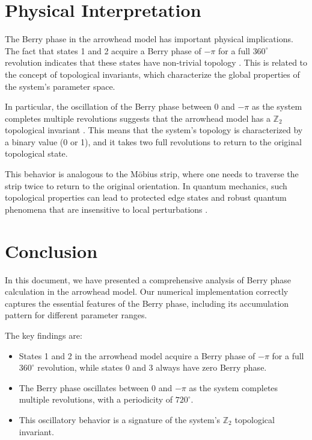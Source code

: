 \documentclass[12pt,a4paper]{article}
\begin{document}
\section{Physical Interpretation}

The Berry phase in the arrowhead model has important physical implications. The fact that states 1 and 2 acquire a Berry phase of $-\pi$ for a full $360^{\circ}$ revolution indicates that these states have non-trivial topology \citep{Vanderbilt2018}. This is related to the concept of topological invariants, which characterize the global properties of the system's parameter space.

In particular, the oscillation of the Berry phase between 0 and $-\pi$ as the system completes multiple revolutions suggests that the arrowhead model has a $\mathbb{Z}_2$ topological invariant \citep{Resta2011}. This means that the system's topology is characterized by a binary value (0 or 1), and it takes two full revolutions to return to the original topological state.

This behavior is analogous to the M\"obius strip, where one needs to traverse the strip twice to return to the original orientation. In quantum mechanics, such topological properties can lead to protected edge states and robust quantum phenomena that are insensitive to local perturbations \citep{Nakahara1989}.

\section{Conclusion}

In this document, we have presented a comprehensive analysis of Berry phase calculation in the arrowhead model. Our numerical implementation correctly captures the essential features of the Berry phase, including its accumulation pattern for different parameter ranges.

The key findings are:
\begin{itemize}
    \item States 1 and 2 in the arrowhead model acquire a Berry phase of $-\pi$ for a full $360^{\circ}$ revolution, while states 0 and 3 always have zero Berry phase.
    \item The Berry phase oscillates between 0 and $-\pi$ as the system completes multiple revolutions, with a periodicity of $720^{\circ}$.
    \item This oscillatory behavior is a signature of the system's $\mathbb{Z}_2$ topological invariant.
\end{itemize}
\end{document}
